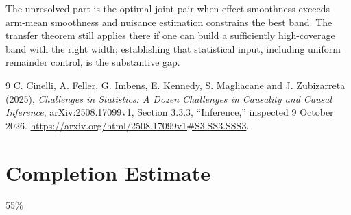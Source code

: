 \documentclass[11pt]{article}
\theoremstyle{remark}
\begin{document}
The unresolved part is the optimal joint pair when effect smoothness exceeds arm-mean smoothness and nuisance estimation constrains the best band. The transfer theorem still applies there if one can build a sufficiently high-coverage band with the right width; establishing that statistical input, including uniform remainder control, is the substantive gap.

\begin{thebibliography}{9}
 C. Cinelli, A. Feller, G. Imbens, E. Kennedy, S. Magliacane and J. Zubizarreta (2025), \emph{Challenges in Statistics: A Dozen Challenges in Causality and Causal Inference}, arXiv:2508.17099v1, Section 3.3.3, ``Inference,'' inspected 9 October 2026. \url{https://arxiv.org/html/2508.17099v1#S3.SS3.SSS3}.
\end{thebibliography}

\section{Completion Estimate}
55\%
\end{document}
